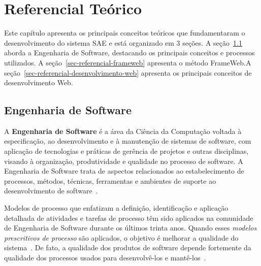 \chapter{Referencial Teórico}
\label{sec-referencial}

Este capítulo apresenta os principais conceitos teóricos que fundamentaram o desenvolvimento do sistema SAE e está organizado em 3 seções. A seção~\ref{sec-referencial-engenharia-software} aborda a Engenharia de Software, destacando os principais conceitos e processos utilizados. A seção~\ref{sec-referencial-frameweb} apresenta o método FrameWeb.A seção~\ref{sec-referencial-desenvolvimento-web} apresenta os principais conceitos de desenvolvimento Web.





\section{Engenharia de Software}
\label{sec-referencial-engenharia-software}

A \textbf{Engenharia de Software} é a área da Ciência da Computação voltada à especificação, ao desenvolvimento e à manutenção de sistemas de software, com aplicação de tecnologias e práticas de gerência de projetos e outras disciplinas, visando à organização, produtividade e qualidade no processo de software. A Engenharia de Software trata de aspectos relacionados ao estabelecimento de processos, métodos, técnicas, ferramentas e ambientes de suporte ao desenvolvimento de software~\cite{falboEngSoft}.

Modelos de processo que enfatizam a definição, identificação e aplicação detalhada de atividades e tarefas de processo têm sido aplicados na comunidade de Engenharia de Software durante os últimos trinta anos. Quando esses \textit{modelos prescritivos de processo} são aplicados, o objetivo é melhorar a qualidade do sistema~\cite{presmannSoft}. 
De fato, a qualidade dos produtos de software depende fortemente da qualidade dos processos usados para desenvolvê-los e mantê-los~\cite{falboEngSoft}.

